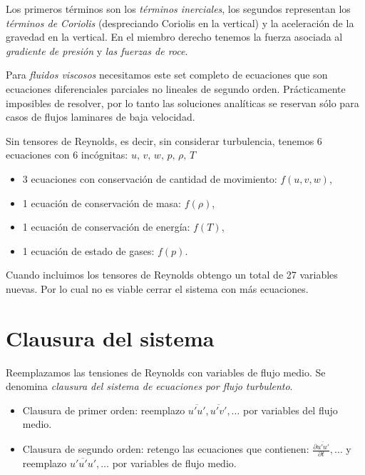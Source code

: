 \documentclass[openany,a4]{book}
\newcommand{\dpar}[2]{\frac{\partial #1}{\partial #2}}
\newcommand{\prom}[1]{\overline{#1}}
\begin{document}
\par Los primeros términos son los \emph{términos inerciales},
 los segundos representan los \emph{términos de Coriolis} 
 (despreciando Coriolis en la vertical) y la aceleración de la 
 gravedad en la vertical. En el miembro derecho tenemos la 
 fuerza asociada al \emph{gradiente de presión} y \emph{las 
 fuerzas de roce}.

\par Para \emph{fluidos viscosos} necesitamos este set completo de 
ecuaciones que son ecuaciones diferenciales parciales no lineales de 
segundo orden. Prácticamente imposibles de resolver, por lo tanto las 
soluciones analíticas se reservan sólo para casos de flujos laminares 
de baja velocidad.

Sin tensores de Reynolds, es decir, sin considerar turbulencia, tenemos 6
ecuaciones con 6 incógnitas: $u,\,v,\,w,\,p,\,\rho,\,T$

\begin{itemize}
	\item 3 ecuaciones con conservación de cantidad de movimiento:
		$f(u,v,w)$,
	\item 1 ecuación de conservación de masa: $f(\rho)$,
	\item 1 ecuación de conservación de energía: $f(T)$,
	\item 1 ecuación de estado de gases: $f(p)$.
\end{itemize}

\par Cuando incluimos los tensores de Reynolds obtengo un total de 27 variables
nuevas. Por lo cual no es viable cerrar el sistema con más ecuaciones.


\section{Clausura del sistema}
Reemplazamos las tensiones de Reynolds con variables de flujo medio.
Se denomina \emph{clausura del sistema de ecuaciones por flujo turbulento}.

\begin{itemize}
	\item Clausura de primer orden: reemplazo $\prom{u'u'},\prom{u'v'},
\dots$ por variables del flujo medio.
	\item Clausura de segundo orden: retengo las ecuaciones que contienen:
		$\dpar{\prom{u'u'}}{t},\dots$ y reemplazo $\prom{u'u'u'},\dots$ por
		variables de flujo medio.
\end{itemize}
		
\end{document}
